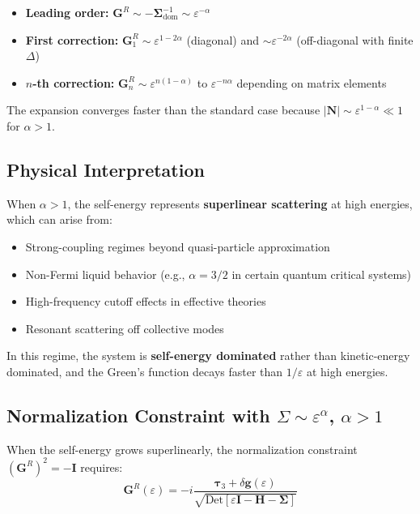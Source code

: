 \documentclass[12pt]{article}
\begin{document}
\begin{itemize}
\item \textbf{Leading order:} $\mathbf{G}^R \sim -\mathbf{\Sigma}_{\text{dom}}^{-1} \sim \varepsilon^{-\alpha}$
\item \textbf{First correction:} $\mathbf{G}^R_1 \sim \varepsilon^{1-2\alpha}$ (diagonal) and $\sim \varepsilon^{-2\alpha}$ (off-diagonal with finite $\Delta$)
\item \textbf{$n$-th correction:} $\mathbf{G}^R_n \sim \varepsilon^{n(1-\alpha)}$ to $\varepsilon^{-n\alpha}$ depending on matrix elements
\end{itemize}

The expansion converges faster than the standard case because $|\mathbf{N}| \sim \varepsilon^{1-\alpha} \ll 1$ for $\alpha > 1$.

\subsection{Physical Interpretation}

When $\alpha > 1$, the self-energy represents \textbf{superlinear scattering} at high energies, which can arise from:
\begin{itemize}
\item Strong-coupling regimes beyond quasi-particle approximation
\item Non-Fermi liquid behavior (e.g., $\alpha = 3/2$ in certain quantum critical systems)
\item High-frequency cutoff effects in effective theories
\item Resonant scattering off collective modes
\end{itemize}

In this regime, the system is \textbf{self-energy dominated} rather than kinetic-energy dominated, and the Green's function decays faster than $1/\varepsilon$ at high energies.

\subsection{Normalization Constraint with $\Sigma \sim \varepsilon^\alpha$, $\alpha > 1$}

When the self-energy grows superlinearly, the normalization constraint $(\mathbf{G}^R)^2 = -\mathbf{I}$ requires:
\begin{equation}
\mathbf{G}^R(\varepsilon) = -i\frac{\boldsymbol{\tau}_3 + \delta\mathbf{g}(\varepsilon)}{\sqrt{\text{Det}[\varepsilon\mathbf{I} - \mathbf{H} - \mathbf{\Sigma}]}}
\end{equation}
\end{document}
